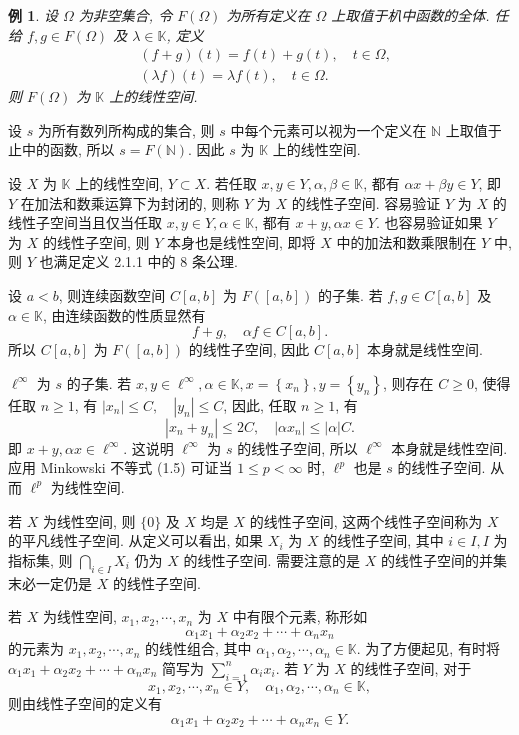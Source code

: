 \documentclass[openany]{ctexbook}
\theoremstyle{kaiti}
\theoremstyle{normal}
\newtheorem{example}{例}[section]
\begin{document}
\begin{example}
设 $\Omega$ 为非空集合, 令 $F(\Omega)$ 为所有定义在 $\Omega$ 上取值于朳中函数的全体. 任给 $f, g \in F(\Omega)$ 及 $\lambda \in \mathbb{K}$, 定义
$$
  \begin{aligned}
    &(f+g)(t)=f(t)+g(t), \quad t \in \Omega, \\
    &(\lambda f)(t)=\lambda f(t), \quad t \in \Omega.
  \end{aligned}
$$
则 $F(\Omega)$ 为 $\mathbb{K}$ 上的线性空间.
\end{example}

设 $s$ 为所有数列所构成的集合, 则 $s$ 中每个元素可以视为一个定义在 $\mathbb{N}$ 上取值于止中的函数, 所以 $s=F(\mathbb{N})$. 因此 $s$ 为 $\mathbb{K}$ 上的线性空间.

设 $X$ 为 $\mathbb{K}$ 上的线性空间, $Y \subset X$. 若任取 $x, y \in Y, \alpha, \beta \in \mathbb{K}$, 都有 $\alpha x+\beta y \in Y$, 即 $Y$ 在加法和数乘运算下为封闭的, 则称 $Y$ 为 $X$ 的线性子空间. 容易验证 $Y$ 为 $X$ 的线性子空间当且仅当任取 $x, y \in Y, \alpha \in \mathbb{K}$, 都有 $x+y, \alpha x \in Y$. 也容易验证如果 $Y$ 为 $X$ 的线性子空间, 则 $Y$ 本身也是线性空间, 即将 $X$ 中的加法和数乘限制在 $Y$ 中, 则 $Y$ 也满足定义 2.1.1 中的 8 条公理.

设 $a<b$, 则连续函数空间 $C[a, b]$ 为 $F([a, b])$ 的子集. 若 $f, g \in C[a, b]$ 及 $\alpha \in \mathbb{K}$, 由连续函数的性质显然有
$$
f+g, \quad \alpha f \in C[a, b].
$$
所以 $C[a, b]$ 为 $F([a, b])$ 的线性子空间, 因此 $C[a, b]$ 本身就是线性空间. 

$\ell^{\infty}$ 为 $s$ 的子集. 若 $x, y \in \ell^{\infty}, \alpha \in \mathbb{K}, x=\left\{x_n\right\}, y=\left\{y_n\right\}$, 则存在 $C \geqslant 0$, 使得任取 $n \geqslant 1$, 有 $\left|x_n\right| \leqslant C, \quad\left|y_n\right| \leqslant C$,
因此, 任取 $n \geqslant 1$, 有
$$
\left|x_n+y_n\right| \leqslant 2 C, \quad\left|\alpha x_n\right| \leqslant|\alpha| C.
$$
即 $x+y, \alpha x \in \ell^{\infty}$. 这说明 $\ell^{\infty}$ 为 $s$ 的线性子空间, 所以 $\ell^{\infty}$ 本身就是线性空间. 应用 Minkowski 不等式 (1.5) 可证当 $1 \leqslant p<\infty$ 时, $\ell^{p}$ 也是 $s$ 的线性子空间. 从而 $\ell^{p}$ 为线性空间.

若 $X$ 为线性空间, 则 $\{0\}$ 及 $X$ 均是 $X$ 的线性子空间, 这两个线性子空间称为 $X$ 的平凡线性子空间. 从定义可以看出, 如果 $X_{i}$ 为 $X$ 的线性子空间, 其中 $i \in I, I$ 为指标集, 则 $\bigcap_{i \in I} X_{i}$ 仍为 $X$ 的线性子空间. 需要注意的是 $X$ 的线性子空间的并集末必一定仍是 $X$ 的线性子空间.

若 $X$ 为线性空间, $x_1, x_2, \cdots, x_n$ 为 $X$ 中有限个元素, 称形如
$$
\alpha_1 x_1+\alpha_2 x_2+\cdots+\alpha_n x_n
$$
的元素为 $x_1, x_2, \cdots, x_n$ 的线性组合, 其中 $\alpha_1, \alpha_2, \cdots, \alpha_n \in \mathbb{K}$. 为了方便起见, 有时将
$\alpha_1 x_1+\alpha_2 x_2+\cdots+\alpha_n x_n$ 简写为 $\sum_{i=1}^n \alpha_{i} x_{i}$. 若 $Y$ 为 $X$ 的线性子空间, 对于
$$
x_1, x_2, \cdots, x_n \in Y, \quad \alpha_1, \alpha_2, \cdots, \alpha_n \in \mathbb{K},
$$
则由线性子空间的定义有
$$
\alpha_1 x_1+\alpha_2 x_2+\cdots+\alpha_n x_n \in Y.
$$
\end{document}
